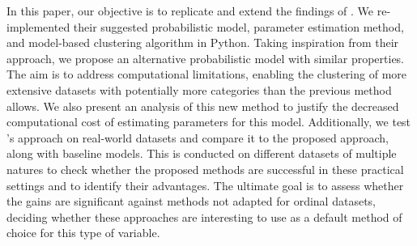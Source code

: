 In this paper, our objective is to replicate and extend the findings of \cite{biernacki2016model}. We re-implemented their suggested probabilistic model, parameter estimation method, and model-based clustering algorithm in Python. Taking inspiration from their approach, we propose an alternative probabilistic model with similar properties. The aim is to address computational limitations, enabling the clustering of more extensive datasets with potentially more categories than the previous method allows. We also present an analysis of this new method to justify the decreased computational cost of estimating parameters for this model. Additionally, we test \cite{biernacki2016model}'s approach on real-world datasets and compare it to the proposed approach, along with baseline models. This is conducted on different datasets of multiple natures to check whether the proposed methods are successful in these practical settings and to identify their advantages. The ultimate goal is to assess whether the gains are significant against methods not adapted for ordinal datasets, deciding whether these approaches are interesting to use as a default method of choice for this type of variable.


